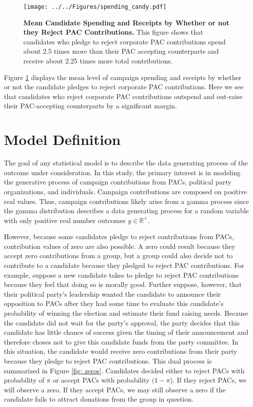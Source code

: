 \documentclass[12pt]{article}
\begin{document}
\begin{figure}[ht]
	\centering
	\texttt{[image: ../../Figures/spending\_candy.pdf]}
	\caption{\textbf{Mean Candidate Spending and Receipts by Whether or not they Reject PAC Contributions.} This figure shows that candidates who pledge to reject corporate PAC contributions spend about 2.5 times more than their PAC accepting counterparts and receive about 2.25 times more total contributions.}
	\label{fig: spending}
\end{figure}

Figure \ref{fig: spending} displays the mean level of campaign spending and receipts by whether or not the candidate pledges to reject corporate PAC contributions. Here we see that candidates who reject corporate PAC contributions outspend and out-raise their PAC-accepting counterparts by a significant margin.


\section{Model Definition}

The goal of any statistical model is to describe the data generating process of the outcome under consideration. In this study, the primary interest is in modeling the generative process of campaign contributions from PACs, political party organizations, and individuals. Campaign contributions are composed on positive real values. Thus, campaign contributions likely arise from a gamma process since the gamma distribution describes a data generating process for a random variable with only positive real number outcomes $y \in  \mathbb{R}^+$. 

However, because some candidates pledge to reject contributions from PACs, contribution values of zero are also possible. A zero could result because they accept zero contributions from a group, but a group could also decide not to contribute to a candidate because they pledged to reject PAC contributions. For example, suppose a new candidate takes to pledge to reject PAC contributions because they feel that doing so is morally good. Further suppose, however, that their political party's leadership wanted the candidate to announce their opposition to PACs after they had some time to evaluate this candidate's probability of winning the election and estimate their fund raising needs. Because the candidate did not wait for the party's approval, the party decides that this candidate has little chance of success given the timing of their announcement and therefore choses not to give this candidate funds from the party committee. In this situation, the candidate would receive zero contributions from their party because they pledge to reject PAC contributions. This dual process is summarized in Figure \ref{fig: zeros}. Candidates decided either to reject PACs with probability of $\pi$ or accept PACs with probability $(1 - \pi$). If they reject PACs, we will observe a zero. If they accept PACs, we may still observe a zero if the candidate fails to attract donations from the group in question. 
\end{document}
